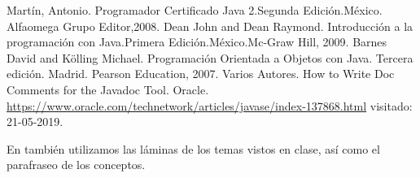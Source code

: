 \documentclass{article}
\begin{document}
\begin{thebibliography}{x}
  
   Martín, Antonio. Programador Certificado Java 2.Segunda Edición.México. Alfaomega Grupo Editor,2008.
   Dean John and Dean Raymond. Introducción a la programación con Java.Primera Edición.México.Mc-Graw Hill, 2009.
   Barnes David and Kölling Michael. Programación Orientada a Objetos con Java. Tercera edición. Madrid. Pearson Education, 2007. 
   Varios Autores. How to Write Doc Comments for the Javadoc Tool. Oracle. \url{https://www.oracle.com/technetwork/articles/javase/index-137868.html} visitado: 21-05-2019.

\end{thebibliography}

En también  utilizamos las láminas de los temas vistos en clase, así como el parafraseo de los conceptos.



\end{document}

